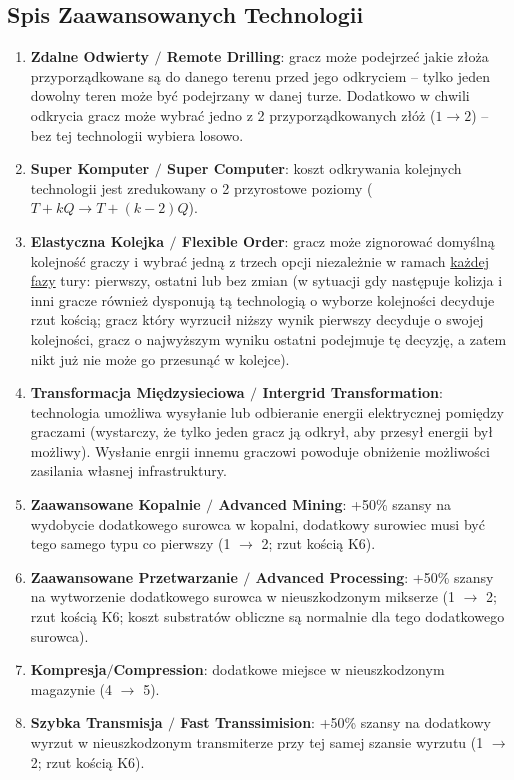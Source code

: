 \documentclass[11pt,a4paper]{article}
\begin{document}
\subsection{Spis Zaawansowanych Technologii}
\begin{enumerate}
\item \textbf{Zdalne Odwierty $/$ Remote Drilling}: gracz może podejrzeć jakie złoża przyporządkowane są do danego terenu przed jego odkryciem -- tylko jeden dowolny teren może być podejrzany w danej turze. Dodatkowo w chwili odkrycia gracz może wybrać jedno z 2 przyporządkowanych złóż ($1 \to 2$) -- bez tej technologii wybiera losowo.
\item \textbf{Super Komputer $/$ Super Computer}: koszt odkrywania kolejnych technologii jest zredukowany o 2 przyrostowe poziomy  ($T+kQ \to T+(k-2)Q$).
\item \textbf{Elastyczna Kolejka $/$ Flexible Order}: gracz może zignorować domyślną kolejność graczy i wybrać jedną z trzech opcji niezależnie w ramach \underline{każdej fazy} tury: pierwszy, ostatni lub bez zmian (w sytuacji gdy następuje kolizja i inni gracze również dysponują tą technologią o wyborze kolejności decyduje rzut kością; gracz który wyrzucił niższy wynik pierwszy decyduje o swojej kolejności, gracz o najwyższym wyniku ostatni podejmuje tę decyzję, a zatem nikt już nie może go przesunąć w kolejce).
\item \textbf{Transformacja Międzysieciowa $/$ Intergrid Transformation}: technologia umożliwa wysyłanie lub odbieranie energii elektrycznej pomiędzy graczami (wystarczy, że tylko jeden gracz ją odkrył, aby przesył energii był możliwy). Wysłanie enrgii innemu graczowi powoduje obniżenie możliwości zasilania własnej infrastruktury.
\item \textbf{Zaawansowane Kopalnie $/$ Advanced Mining}: +50\% szansy na wydobycie dodatkowego surowca w kopalni, dodatkowy surowiec musi być tego samego typu co pierwszy (1 $\to$ 2; rzut kością K6).
\item \textbf{Zaawansowane Przetwarzanie $/$ Advanced Processing}: +50\% szansy na wytworzenie dodatkowego surowca w nieuszkodzonym mikserze (1 $\to$ 2; rzut kością K6; koszt substratów obliczne są normalnie dla tego dodatkowego surowca).
\item \textbf{Kompresja$/$Compression}: dodatkowe miejsce w nieuszkodzonym magazynie (4 $\to$ 5).
\item \textbf{Szybka Transmisja $/$ Fast Transsimision}: +50\% szansy na dodatkowy wyrzut w nieuszkodzonym transmiterze przy tej samej szansie wyrzutu (1 $\to$ 2; rzut kością K6).

\end{enumerate}
\end{document}

